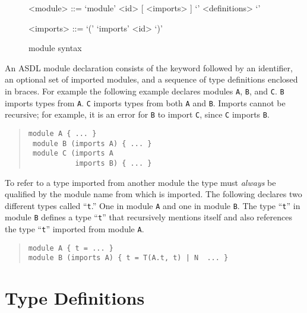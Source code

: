 \begin{figure}[ht]
  \begin{center}
    \begin{grammar}
      <module>  ::=  `module' <id> [ <imports> ] `{' <definitions> `}'

      <imports> ::=  `(' { `imports' <id> } `)'
    \end{grammar}
  \end{center}
  \caption{\asdl{} module syntax}
\end{figure}%

An ASDL module declaration consists of the keyword 
followed by an identifier, an optional set of imported modules, and a
sequence of type definitions enclosed in braces. For example the
following example declares modules \lstinline[language=ASDL]!A!,
\lstinline[language=ASDL]!B!, and \lstinline[language=ASDL]!C!.
\lstinline[language=ASDL]!B! imports types from \lstinline[language=ASDL]!A!.
\lstinline[language=ASDL]!C! imports types from both \lstinline[language=ASDL]!A! and
\lstinline[language=ASDL]!B!.
Imports cannot be recursive; for example, it is an error for \lstinline[language=ASDL]!B! to
import \lstinline[language=ASDL]!C!, since \lstinline[language=ASDL]!C!
imports \lstinline[language=ASDL]!B!.
\begin{quote}\begin{lstlisting}[language=ASDL]
 module A { ... } 
 module B (imports A) { ... }
 module C (imports A 
           imports B) { ... }
\end{lstlisting}\end{quote}%

To refer to a type imported from another module the type must
\emph{always} be qualified by the module name from which is
imported.
The following declares two different types called ``\texttt{t}.''
One in module \texttt{A} and one in module \texttt{B}.
The type ``\texttt{t}'' in module \texttt{B} defines a type ``\texttt{t}'' that
recursively mentions itself and also references the type ``\texttt{t}'' imported
from module \texttt{A}.
\begin{quote}\begin{lstlisting}[language=ASDL]
module A { t = ... } 
module B (imports A) { t = T(A.t, t) | N  ... }
\end{lstlisting}\end{quote}%

\section{Type Definitions}

